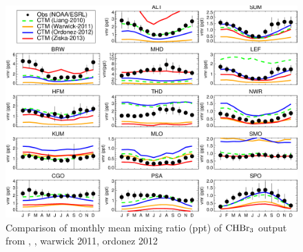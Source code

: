\begin{figure}
    \centering
    \includegraphics[width =0.7\linewidth]{Appendix/images/Hossaini2013_fig5_bromoform.png}
    \caption{Comparison of monthly mean mixing ratio (ppt) of $\mathrm{CHBr_3}$ output from \cite{Liang2010}, \cite{ziska}, warwick 2011, ordonez 2012}
    \label{fig:Hosaini_fig5}
\end{figure}
